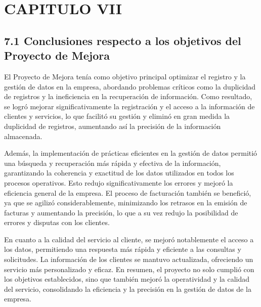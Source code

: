 \newpage
\section{CAPITULO VII}
\subsection{7.1 Conclusiones respecto a los objetivos del Proyecto de Mejora}

El Proyecto de Mejora tenía como objetivo principal optimizar el registro y la gestión de datos en la empresa, abordando problemas críticos como la duplicidad de registros y la ineficiencia en la recuperación de información. Como resultado, se logró mejorar significativamente la registración y el acceso a la información de clientes y servicios, lo que facilitó su gestión y eliminó en gran medida la duplicidad de registros, aumentando así la precisión de la información almacenada.

Además, la implementación de prácticas eficientes en la gestión de datos permitió una búsqueda y recuperación más rápida y efectiva de la información, garantizando la coherencia y exactitud de los datos utilizados en todos los procesos operativos. Esto redujo significativamente los errores y mejoró la eficiencia general de la empresa. El proceso de facturación también se benefició, ya que se agilizó considerablemente, minimizando los retrasos en la emisión de facturas y aumentando la precisión, lo que a su vez redujo la posibilidad de errores y disputas con los clientes.

En cuanto a la calidad del servicio al cliente, se mejoró notablemente el acceso a los datos, permitiendo una respuesta más rápida y eficiente a las consultas y solicitudes. La información de los clientes se mantuvo actualizada, ofreciendo un servicio más personalizado y eficaz. En resumen, el proyecto no solo cumplió con los objetivos establecidos, sino que también mejoró la operatividad y la calidad del servicio, consolidando la eficiencia y la precisión en la gestión de datos de la empresa.



